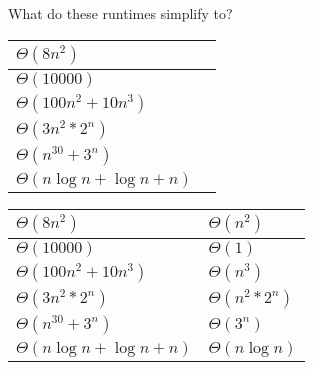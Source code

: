 \begin{blocksection}
\question What do these runtimes simplify to? \newline

\begin{tabular}{ |p{4cm}|p{4cm}|}
\hline
$\Theta(8n^{2})$& \\[7pt] \hline
$\Theta(10000)$& \\[7pt] \hline
$\Theta(100n^{2} + 10n^{3})$& \\[7pt] \hline
$\Theta(3n^{2} * 2^{n})$& \\[7pt] \hline
$\Theta(n^{30} + 3^{n})$& \\[7pt] \hline
$\Theta(n\log{n} + \log{n} + n)$& \\[7pt] \hline
\end{tabular}

\begin{solution}[0.25in]
\begin{tabular}{ |p{4cm}|p{4cm}|}
\hline
$\Theta(8n^{2})$&$\Theta(n^{2})$\\[7pt] \hline
$\Theta(10000)$&$\Theta(1)$\\[7pt] \hline
$\Theta(100n^{2} + 10n^{3})$&$\Theta(n^{3})$\\[7pt] \hline
$\Theta(3n^{2} * 2^{n})$&$\Theta(n^{2} * 2^{n})$\\[7pt] \hline
$\Theta(n^{30} + 3^{n})$&$\Theta(3^{n})$\\[7pt] \hline
$\Theta(n\log{n} + \log{n} + n)$&$\Theta(n\log{n})$\\[7pt] \hline
\end{tabular}
\end{solution}

\end{blocksection}
